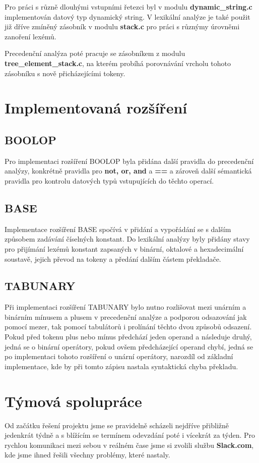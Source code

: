 \documentclass[12pt]{article}
\begin{document}
Pro práci s různě dlouhými vstupními řetezci byl v modulu \textbf{dynamic\_string.c} implementován datový typ dynamický string. V lexikální analýze je také použit již dříve zmíněný zásobník v modulu \textbf{stack.c} pro práci s různýmy úrovněmi zanoření lexémů.


Precedenční analýza poté pracuje se zásobníkem z modulu \textbf{tree\_element\_stack.c}, na kterém pro\-bí\-há porovnávání vrcholu tohoto zásobníku s nově přicházejícími tokeny.
\section{Implementovaná rozšíření}
\subsection{BOOLOP}
Pro implementaci rozšíření BOOLOP byla přidána další pravidla do precedenční analýzy, konkrétně pravidla pro \textbf{not, or, and} a \textbf{==} a zároveň další sémantická pravidla pro kontrolu datových typů vstupujících do těchto operací.
\subsection{BASE}
Implementace rozšíření BASE spočívá v přidání a vypořádání se s dalším způsobem zadávání čí\-sel\-ných konstant. Do lexikální analýzy byly přidány stavy pro přijímání lexémů konstant zapsaných v binární, oktalové a hexadecimální soustavě, jejich převod na tokeny a předání dalším částem pře\-kla\-da\-če.
\subsection{TABUNARY}

Při implementaci rozšíření TABUNARY bylo nutno rozlišovat mezi unárním a bi\-nár\-ním mínusem a plusem v precedenční analýze a podporou odsazování jak pomocí mezer, tak pomocí tabulátorů i prolínání těchto dvou způsobů odsazení. Pokud před tokenu plus nebo mínus předchází jeden operand a následuje druhý, jedná se o binární operátory, pokud ovšem předcházející operand chybí, jedná se po implementaci tohoto rozšíření o unární operátory, narozdíl od základní implementace, kde by při tomto zápisu nastala syntaktická chyba překladu.
\section{Týmová spolupráce}
Od začátku řešení projektu jsme se pravidelně scházeli nejdříve přibližně jedenkrát týdně a s blížícím se termínem odevzdání poté i vícekrát za týden. Pro rychlou komunikaci mezi sebou v reálném čase jsme si zvolili službu \textbf{Slack.com}, kde jsme ihned řešili všechny problémy, které nastaly.
\end{document}
